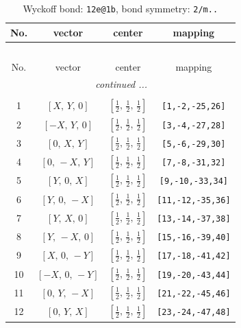 \documentclass[fleqn,8pt]{jsarticle}
\begin{document}
\renewcommand{\arraystretch}{1.2}
\begin{longtable}{cccc}
\caption{Wyckoff bond: {\tt 12e@1b}, bond symmetry: {\tt 2/m..}}
 \\
 \hline \hline
No. & vector & center & mapping \\ \hline \endfirsthead

\multicolumn{3}{l}{\tablename\ \thetable{}} \\
 \hline \hline
No. & vector & center & mapping \\ \hline \endhead

 \hline \hline
\multicolumn{3}{r}{\footnotesize\it continued ...} \\ \endfoot

 \hline \hline
\multicolumn{3}{r}{} \\ \endlastfoot

1 & $\left[ X,\, Y,\, 0 \right]$ & $\left[ \frac{1}{2},\, \frac{1}{2},\, \frac{1}{2} \right]$ & {\tt [1,-2,-25,26]} \\ \hline
2 & $\left[ - X,\, Y,\, 0 \right]$ & $\left[ \frac{1}{2},\, \frac{1}{2},\, \frac{1}{2} \right]$ & {\tt [3,-4,-27,28]} \\ \hline
3 & $\left[ 0,\, X,\, Y \right]$ & $\left[ \frac{1}{2},\, \frac{1}{2},\, \frac{1}{2} \right]$ & {\tt [5,-6,-29,30]} \\ \hline
4 & $\left[ 0,\, - X,\, Y \right]$ & $\left[ \frac{1}{2},\, \frac{1}{2},\, \frac{1}{2} \right]$ & {\tt [7,-8,-31,32]} \\ \hline
5 & $\left[ Y,\, 0,\, X \right]$ & $\left[ \frac{1}{2},\, \frac{1}{2},\, \frac{1}{2} \right]$ & {\tt [9,-10,-33,34]} \\ \hline
6 & $\left[ Y,\, 0,\, - X \right]$ & $\left[ \frac{1}{2},\, \frac{1}{2},\, \frac{1}{2} \right]$ & {\tt [11,-12,-35,36]} \\ \hline
7 & $\left[ Y,\, X,\, 0 \right]$ & $\left[ \frac{1}{2},\, \frac{1}{2},\, \frac{1}{2} \right]$ & {\tt [13,-14,-37,38]} \\ \hline
8 & $\left[ Y,\, - X,\, 0 \right]$ & $\left[ \frac{1}{2},\, \frac{1}{2},\, \frac{1}{2} \right]$ & {\tt [15,-16,-39,40]} \\ \hline
9 & $\left[ X,\, 0,\, - Y \right]$ & $\left[ \frac{1}{2},\, \frac{1}{2},\, \frac{1}{2} \right]$ & {\tt [17,-18,-41,42]} \\ \hline
10 & $\left[ - X,\, 0,\, - Y \right]$ & $\left[ \frac{1}{2},\, \frac{1}{2},\, \frac{1}{2} \right]$ & {\tt [19,-20,-43,44]} \\ \hline
11 & $\left[ 0,\, Y,\, - X \right]$ & $\left[ \frac{1}{2},\, \frac{1}{2},\, \frac{1}{2} \right]$ & {\tt [21,-22,-45,46]} \\ \hline
12 & $\left[ 0,\, Y,\, X \right]$ & $\left[ \frac{1}{2},\, \frac{1}{2},\, \frac{1}{2} \right]$ & {\tt [23,-24,-47,48]} \\
\end{longtable}
\end{document}
